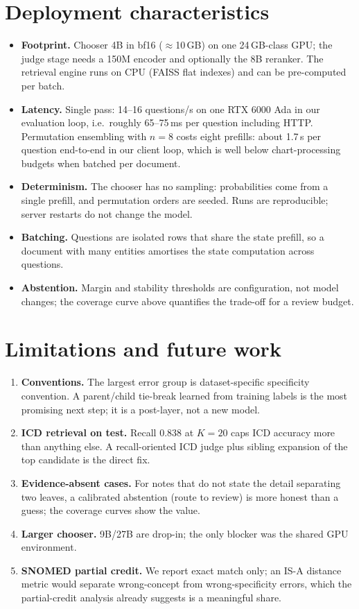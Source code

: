 \documentclass[11pt]{article}
\begin{document}
\section{Deployment characteristics}
\begin{itemize}[leftmargin=1.2em]
  \item \textbf{Footprint.} Chooser 4B in bf16 ($\approx$10\,GB) on one 24\,GB-class GPU;
  the judge stage needs a 150M encoder and optionally the 8B reranker. The retrieval engine
  runs on CPU (FAISS flat indexes) and can be pre-computed per batch.
  \item \textbf{Latency.} Single pass: 14--16 questions/s on one RTX 6000 Ada in our
  evaluation loop, i.e.\ roughly 65--75\,ms per question including HTTP. Permutation
  ensembling with $n{=}8$ costs eight prefills: about 1.7\,s per question end-to-end in our
  client loop, which is well below chart-processing budgets when batched per document.
  \item \textbf{Determinism.} The chooser has no sampling: probabilities come from a single
  prefill, and permutation orders are seeded. Runs are reproducible; server restarts do not
  change the model.
  \item \textbf{Batching.} Questions are isolated rows that share the state prefill, so a
  document with many entities amortises the state computation across questions.
  \item \textbf{Abstention.} Margin and stability thresholds are configuration, not model
  changes; the coverage curve above quantifies the trade-off for a review budget.
\end{itemize}

\section{Limitations and future work}
\begin{enumerate}[leftmargin=1.2em]
  \item \textbf{Conventions.} The largest error group is dataset-specific specificity
  convention. A parent/child tie-break learned from training labels is the most promising
  next step; it is a post-layer, not a new model.
  \item \textbf{ICD retrieval on test.} Recall 0.838 at $K{=}20$ caps ICD accuracy more than
  anything else. A recall-oriented ICD judge plus sibling expansion of the top candidate is
  the direct fix.
  \item \textbf{Evidence-absent cases.} For notes that do not state the detail separating two
  leaves, a calibrated abstention (route to review) is more honest than a guess; the
  coverage curves show the value.
  \item \textbf{Larger chooser.} 9B/27B are drop-in; the only blocker was the shared GPU
  environment.
  \item \textbf{SNOMED partial credit.} We report exact match only; an IS-A distance metric
  would separate wrong-concept from wrong-specificity errors, which the partial-credit
  analysis already suggests is a meaningful share.
\end{enumerate}
\end{document}
